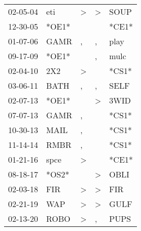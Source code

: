 \begin{supertabular}{lllll}
 02-05-04 &    eti &  \textgreater &  \textgreater &   SOUP \\
 12-30-05 &  *OE1* &               &               &  *CE1* \\
 01-07-06 &   GAMR &             , &             , &   play \\
 09-17-09 &  *OE1* &               &             , &   mulc \\
 02-04-10 &    2X2 &  \textgreater &               &  *CS1* \\
 03-06-11 &   BATH &             , &             , &   SELF \\
 02-07-13 &  *OE1* &               &  \textgreater &   3WID \\
 07-07-13 &   GAMR &             , &               &  *CS1* \\
 10-30-13 &   MAIL &             , &               &  *CS1* \\
 11-14-14 &   RMBR &             , &               &  *CS1* \\
 01-21-16 &   spce &  \textgreater &               &  *CE1* \\
 08-18-17 &  *OS2* &               &  \textgreater &   OBLI \\
 02-03-18 &    FIR &  \textgreater &  \textgreater &    FIR \\
 02-21-19 &    WAP &  \textgreater &  \textgreater &   GULF \\
 02-13-20 &   ROBO &  \textgreater &             , &   PUPS \\
\end{supertabular}
